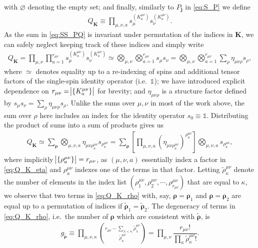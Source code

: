 \documentclass[pra,reprint,longbibliography]{revtex4-1}
\newcommand{\f}[2]{\dfrac{#1}{#2}} %
\newcommand{\p}[1]{\left(#1\right)} %
\renewcommand{\sp}[1]{\left[#1\right]} %
\renewcommand{\set}[1]{\left\{#1\right\}} %
\renewcommand{\v}{\bm} %
\newcommand{\1}{\mathds{1}}
\begin{document}
with $\varnothing$ denoting the empty set; and finally, similarly to
$P_{\v j}$ in \eqref{eq:S_P} we define
\begin{align}
  Q_{\v K} \equiv \prod_{\mu,\nu,a}
  s_\mu^{(K^{\mu\nu}_a)} s_\nu^{(K^{\mu\nu}_a)}.
\end{align}
As the sum in \eqref{eq:SS_PQ} is invariant under permutation of the
indices in $\v K$, we can safely neglect keeping track of these
indices and simply write
\begin{align}
  Q_{\v K}
  = \prod_{\mu,\nu} \prod_{a=1}^{r_{\mu\nu}}
  s_\mu^{(K^{\mu\nu}_a)} s_\nu^{(K^{\mu\nu}_a)}
  \simeq \bigotimes_{\mu,\nu} \bigotimes_{a=1}^{r_{\mu\nu}} s_\mu s_\nu
  = \bigotimes_{\mu,\nu} \bigotimes_{a=1}^{r_{\mu\nu}}
  \sum_\rho \eta_{\mu\nu\rho} s_\rho,
  \label{eq:Q_K_eta}
\end{align}
where $\simeq$ denotes equality up to a re-indexing of spins and
additional tensor factors of the single-spin identity operator
(i.e.~$\1$); we have introduced explicit dependence on
$r_{\mu\nu}=\abs{\set{K^{\mu\nu}_a}}$ for brevity; and
$\eta_{\mu\nu\rho}$ is a structure factor defined by
$s_\mu s_\nu=\sum_\rho\eta_{\mu\nu\rho}s_\rho$.  Unlike the sums over
$\mu,\nu$ in most of the work above, the sum over $\rho$ here includes
an index for the identity operator $s_0\equiv\1$.  Distributing the
product of sums into a sum of products gives us
\begin{align}
  Q_{\v K}
  \simeq \sum_{\v\rho} \bigotimes_{\mu,\nu,a}
  \eta_{\mu\nu\rho^{\mu\nu}_a} s_{\rho^{\mu\nu}_a}
  = \sum_{\v\rho} \sp{\prod_{\mu,\nu,a}
    \p{\eta_{\mu\nu\rho^{\mu\nu}_a}}^{\rho^{\mu\nu}_a}}
  \bigotimes_{\mu,\nu,a} s_{\rho^{\mu\nu}_a},
  \label{eq:Q_K_rho}
\end{align}
where implicitly $\abs{\set{\rho^{\mu\nu}_a}}=r_{\mu\nu}$, as
$\p{\mu,\nu,a}$ essentially index a factor in \eqref{eq:Q_K_eta} and
$\rho^{\mu\nu}_a$ indexes one of the terms in that factor.  Letting
$\tilde\rho^{\mu\nu}_\kappa$ denote the number of elements in the
index list
$\p{\rho^{\mu\nu}_1,\rho^{\mu\nu}_2,\cdots,\rho^{\mu\nu}_{r_{\mu\nu}}}$
that are equal to $\kappa$, we observe that two terms in
\eqref{eq:Q_K_rho} with, say, $\v\rho=\v\rho_1$ and $\v\rho=\v\rho_2$
are equal up to a permutation of indices if
$\tilde{\v\rho}_1=\tilde{\v\rho}_2$.  The degeneracy of terms in
\eqref{eq:Q_K_rho}, i.e.~the number of $\v\rho$ which are consistent
with $\tilde{\v\rho}$, is
\begin{align}
  g_{\tilde{\v\rho}}
  \equiv \prod_{\mu,\nu,\kappa}
  { r_{\mu\nu} - \sum_{\lambda<\kappa} \tilde\rho^{\mu\nu}_\lambda
    \choose \tilde\rho^{\mu\nu}_\kappa }
  = \prod_{\mu,\nu}
  \f{r_{\mu\nu}!}{\prod_\kappa\tilde\rho^{\mu\nu}_\kappa!}.
\end{align}
\end{document}
